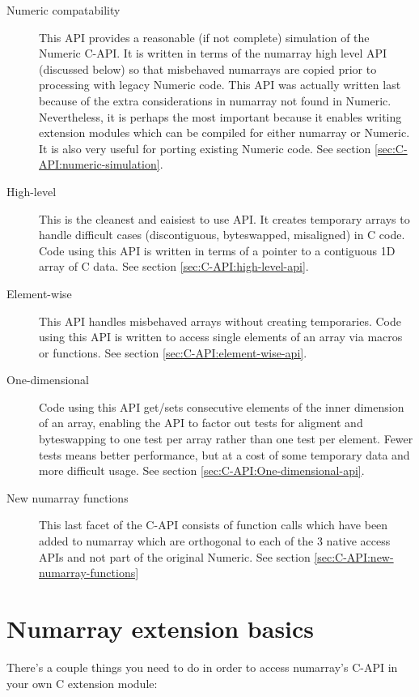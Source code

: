\begin{description}
\item[Numeric compatability] This API provides a reasonable (if not complete)
   simulation of the Numeric C-API.  It is written in terms of the numarray
   high level API (discussed below) so that misbehaved numarrays are copied
   prior to processing with legacy Numeric code.  This API was actually written
   last because of the extra considerations in numarray not found in Numeric.
   Nevertheless, it is perhaps the most important because it enables writing
   extension modules which can be compiled for either numarray or Numeric.  It
   is also very useful for porting existing Numeric code.  See section
   \ref{sec:C-API:numeric-simulation}.
\item[High-level] This is the cleanest and eaisiest to use API.  It creates
   temporary arrays to handle difficult cases (discontiguous, byteswapped,
   misaligned) in C code.  Code using this API is written in terms of a pointer
   to a contiguous 1D array of C data.  See section
   \ref{sec:C-API:high-level-api}.
\item[Element-wise] This API handles misbehaved arrays without creating
     temporaries.  Code using this API is written to access single elements of
     an array via macros or functions.   See
     section \ref{sec:C-API:element-wise-api}.
\item[One-dimensional] Code using this API get/sets consecutive elements of the
   inner dimension of an array, enabling the API to factor out tests for
   aligment and byteswapping to one test per array rather than one test per
   element.  Fewer tests means better performance, but at a cost of some
   temporary data and more difficult usage.  See section
   \ref{sec:C-API:One-dimensional-api}.
\item[New numarray functions] This last facet of the C-API consists of function
  calls which have been added to numarray which are orthogonal to each of the 3
  native access APIs and not part of the original Numeric. See section
  \ref{sec:C-API:new-numarray-functions}
\end{description}

\section{Numarray extension basics}
There's a couple things you need to do in order to access numarray's C-API in
your own C extension module:

